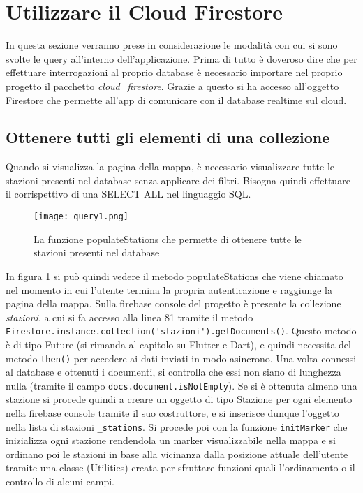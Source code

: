 \section{Utilizzare il Cloud Firestore}
In questa sezione verranno prese in considerazione le modalità con cui si sono
svolte le query all'interno dell'applicazione. Prima di tutto è doveroso dire
che per effettuare interrogazioni al proprio database è necessario importare nel
proprio progetto il pacchetto \textit{cloud\_firestore}. Grazie a questo si ha
accesso all'oggetto Firestore che permette all'app di comunicare con il database
realtime sul cloud.
\subsection{Ottenere tutti gli elementi di una collezione}
Quando si visualizza la pagina della mappa, è necessario visualizzare tutte le
stazioni presenti nel database senza applicare dei filtri. Bisogna quindi
effettuare il corrispettivo di una SELECT ALL nel linguaggio SQL. 
\begin{figure}[!h]
    \centering
    \texttt{[image: query1.png]}
    \caption{La funzione populateStations che permette di ottenere tutte le stazioni presenti nel database}
    \label{query1}
\end{figure}
In figura \ref{query1} si può quindi vedere il metodo populateStations che viene
chiamato nel momento in cui l'utente termina la propria autenticazione e
raggiunge la pagina della mappa. Sulla firebase console del progetto è presente
la collezione \textit{stazioni}, a cui si fa accesso alla linea 81 tramite il
metodo \verb|Firestore.instance.collection('stazioni').getDocuments()|. Questo
metodo è di tipo Future (si rimanda al capitolo su Flutter e Dart), e quindi
necessita del metodo \verb|then()| per accedere ai dati inviati in modo
asincrono. Una volta connessi al database e ottenuti i documenti, si controlla
che essi non siano di lunghezza nulla (tramite il campo
\verb|docs.document.isNotEmpty|). Se si è ottenuta almeno una stazione si
procede quindi a creare un oggetto di tipo Stazione per ogni elemento nella
firebase console tramite il suo costruttore, e si inserisce dunque l'oggetto
nella lista di stazioni \verb|_stations|. Si procede poi con la funzione
\verb|initMarker| che inizializza ogni stazione rendendola un marker
visualizzabile nella mappa e si ordinano poi le stazioni in base alla vicinanza
dalla posizione attuale dell'utente tramite una classe (Utilities) creata per
sfruttare funzioni quali l'ordinamento o il controllo di alcuni campi.

